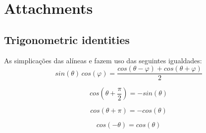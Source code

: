 \documentclass[a4paper]{article}
\begin{document}
\clearpage
\section{Attachments}
\subsection{Trigonometric identities}
\label{subsec:trigident}
\noindent As simplicações das alíneas \emph{} e \emph{} fazem uso das seguintes igualdades:
\begin{equation}
sin(\theta) \, cos(\varphi) = \frac{cos(\theta - \varphi) + cos(\theta + \varphi)}{2}
\end{equation}

\begin{equation}
cos\left(\theta + \frac{\pi}{2}\right) = -sin(\theta)
\end{equation}

\begin{equation}
cos(\theta + \pi) = -cos(\theta)
\end{equation}

\begin{equation}
cos(-\theta) = cos(\theta)
\end{equation}
\end{document}
